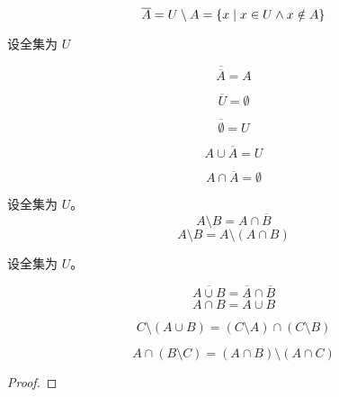 \begin{frame}{}
  \begin{definition}
    \[
      \overline{A} = U \setminus A = \{x \mid x \in U \land x \notin A\}
    \]
  \end{definition}

  \pause
  \vspace{0.30cm}
  \begin{center}
  \end{center}
\end{frame}

\begin{frame}{}
  \begin{center}
    设全集为 $U$
  \end{center}
  \[
    \overline{\overline{A}} = A
  \]

  \[
    \overline{U} = \emptyset
  \]

  \[
    \overline{\emptyset} = U
  \]

  \[
    A \cup \overline{A} = U
  \]

  \[
    A \cap \overline{A} = \emptyset
  \]
\end{frame}

\begin{frame}{}
  \begin{theorem}
    设全集为 $U$。
    \[
      A \setminus B = A \cap \overline{B}
    \]
    \[
      A \setminus B = A \setminus (A \cap B)
    \]
  \end{theorem}
\end{frame}

\begin{frame}{}
  \begin{theorem}[德摩根律]
    设全集为 $U$。

    \[
      \overline{A \cup B} = \overline{A} \cap \overline{B}
    \]
    \[
      \overline{A \cap B} = \overline{A} \cup \overline{B}
    \]
  \end{theorem}

  \pause
  \begin{theorem}[德摩根律]
    \[
      C \setminus (A \cup B) = (C \setminus A) \cap (C \setminus B)
    \]
  \end{theorem}
\end{frame}

\begin{frame}{}
  \begin{theorem}
    \[
      A \cap (B \setminus C) = (A \cap B) \setminus (A \cap C)
    \]
  \end{theorem}

  \pause
  \begin{proof}
  \end{proof}
\end{frame}

